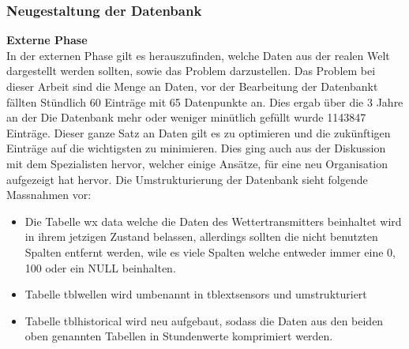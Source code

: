 \subsubsection{Neugestaltung der Datenbank}
\textbf{Externe Phase}\\
In der externen Phase gilt es herauszufinden, welche Daten aus der realen Welt dargestellt werden sollten, sowie das Problem darzustellen. Das Problem bei dieser Arbeit sind die Menge an Daten, vor der Bearbeitung der Datenbankt fällten Stündlich 60 Einträge mit 65 Datenpunkte an. Dies ergab über die 3 Jahre an der Die Datenbank mehr oder weniger minütlich gefüllt wurde 1143847 Einträge. Dieser ganze Satz an Daten gilt es zu optimieren und die zukünftigen Einträge auf die wichtigsten zu minimieren. Dies ging auch aus der Diskussion mit dem Spezialisten hervor, welcher einige Ansätze, für eine neu Organisation aufgezeigt hat hervor. Die Umstrukturierung der Datenbank sieht folgende Massnahmen vor:
\begin{itemize}
\item Die Tabelle wx data welche die Daten des Wettertransmitters beinhaltet wird in ihrem jetzigen Zustand belassen, allerdings sollten die nicht benutzten Spalten entfernt werden, wile es viele Spalten welche entweder immer eine 0, 100 oder ein NULL beinhalten.
\item Tabelle tblwellen wird umbenannt in tblextsensors und umstrukturiert
\item Tabelle tblhistorical wird neu aufgebaut, sodass die Daten aus den beiden oben genannten Tabellen in Stundenwerte komprimiert werden.
\end{itemize}

